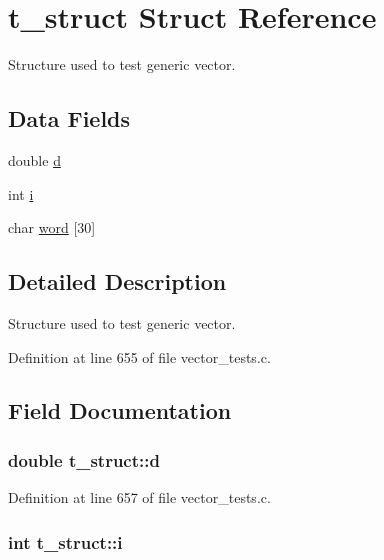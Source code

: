 \hypertarget{structt__struct}{\section{t\-\_\-struct \-Struct \-Reference}
\label{structt__struct}
}


\-Structure used to test generic vector.  


\subsection*{\-Data \-Fields}
\begin{DoxyCompactItemize}
\item 
double \hyperlink{structt__struct_a2029e2f2da88d23bcc9fa6ba45f51bf4}{d}
\item 
int \hyperlink{structt__struct_a488184c86cae0be164cfb634882b8f7a}{i}
\item 
char \hyperlink{structt__struct_ab5b290b572fc4036f1e5efc671098c7f}{word} \mbox{[}30\mbox{]}
\end{DoxyCompactItemize}


\subsection{\-Detailed \-Description}
\-Structure used to test generic vector. 



\-Definition at line 655 of file vector\-\_\-tests.\-c.



\subsection{\-Field \-Documentation}
\hypertarget{structt__struct_a2029e2f2da88d23bcc9fa6ba45f51bf4}{
\subsubsection[{d}]{\setlength{\rightskip}{0pt plus 5cm}double {\bf t\-\_\-struct\-::d}}}\label{structt__struct_a2029e2f2da88d23bcc9fa6ba45f51bf4}


\-Definition at line 657 of file vector\-\_\-tests.\-c.

\hypertarget{structt__struct_a488184c86cae0be164cfb634882b8f7a}{
\subsubsection[{i}]{\setlength{\rightskip}{0pt plus 5cm}int {\bf t\-\_\-struct\-::i}}}\label{structt__struct_a488184c86cae0be164cfb634882b8f7a}



